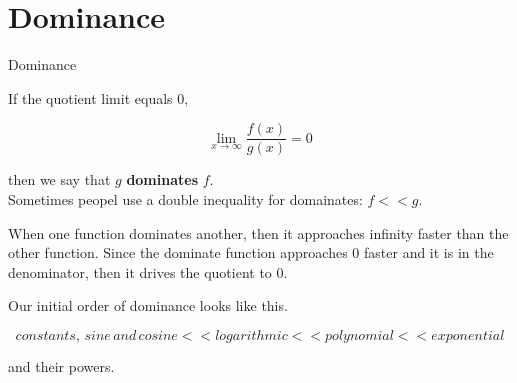\documentclass{ximera}
\begin{document}
\section{Dominance}



\begin{definition}  Dominance

If the quotient limit equals $0$,

\[  \lim_{x \to \infty} \frac{f(x)}{g(x)}  = 0\]

then we say that $g$ \textbf{dominates} $f$. \\



Sometimes peopel use a double inequality for domainates:  $f << g$.\\

\end{definition}



When one function dominates another, then it approaches infinity faster than the other function.  Since the dominate function approaches $0$ faster and it is in the denominator, then it drives the quotient to $0$.


Our initial order of dominance looks like this. \\


\begin{summary}


\[   constants, \, sine \, and \, cosine << logarithmic << polynomial <<  exponential  \]



and their powers.


\end{summary}
\end{document}
